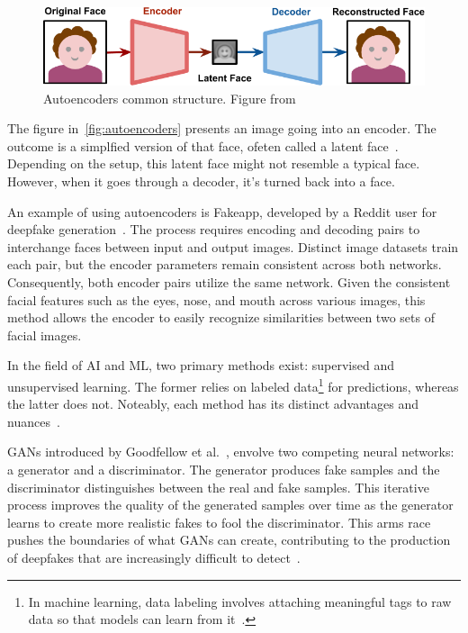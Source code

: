 \begin{figure}[ht]
	\centering
	\includegraphics[scale=0.45]{figures/deepfakes_00d}
	\caption{Autoencoders common structure. Figure from~\cite{autoencoders-image-alazucconi}}\label{fig:autoencoders}
\end{figure}

The figure in~\autoref{fig:autoencoders} presents an image going
into an encoder. The outcome is a simplfied version of that face, ofeten called a latent face~\cite{autoencoders-image-alazucconi}.
Depending on the setup, this latent face might not resemble a typical face. However, when it goes
through a decoder, it's turned back into a face.

An example of using autoencoders is Fakeapp, developed by a Reddit user for deepfake generation~\cite{s22124556,fakeapp-app}.
The process requires encoding and decoding pairs to interchange faces between input and
output images. Distinct image datasets train each pair, but the encoder parameters remain
consistent across both networks. Consequently, both encoder pairs utilize the same network. Given
the consistent facial features such as the eyes, nose, and mouth across various images,
this method allows the encoder to easily recognize similarities between two sets of facial images.

In the field of \ac{AI} and \ac{ML}, two primary methods exist: supervised and unsupervised learning.
The former relies on labeled data\footnote{In machine learning, data labeling involves attaching
	meaningful tags to raw data so that models can learn from it~\cite{labeled-data}.}
for predictions, whereas the latter does not. Noteably, each method has its distinct advantages and
nuances~\cite{ibm-machine-learning}.

\ac{GAN}s introduced by Goodfellow et al.~\cite{goodfellow2014generative}, envolve two
competing neural networks: a generator and a discriminator. The generator produces
fake samples and the discriminator distinguishes between the real and fake samples.
This iterative process improves the quality of the generated samples over time as
the generator learns to create more realistic fakes to fool the discriminator. This
arms race pushes the boundaries of what \ac{GAN}s can create, contributing to the
production of deepfakes that are increasingly difficult to detect~\cite{brock2019large}.


